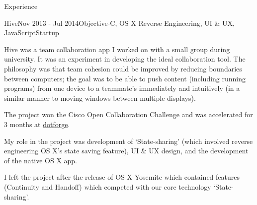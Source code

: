 \documentclass{resume} %
\begin{document}
\begin{rSection}{Experience}

\begin{rSubsection}{Hive}{Nov 2013 - Jul 2014}{Objective-C, OS X Reverse Engineering,  UI \& UX, JavaScript}{Startup}
\item Hive was a team collaboration app I worked on with a small group during university. It was an experiment in developing the ideal collaboration tool. The philosophy was that team cohesion could be improved by reducing boundaries between computers; the goal was to be able to push content (including running programs) from one device to a teammate's immediately and intuitively (in a similar manner to moving windows between multiple displays).
\item The project won the Cisco Open Collaboration Challenge and was accelerated for 3 months at \href{http://www.dotforge.com/}{dotforge}.
\item My role in the project was development of `State-sharing' (which involved reverse engineering OS X's state saving feature), UI \& UX design, and the development of the native OS X app.
\item I left the project after the release of OS X Yosemite which contained features (Continuity and Handoff) which competed with our core technology `State-sharing'.
\end{rSubsection}


\end{rSection}



\end{document}
